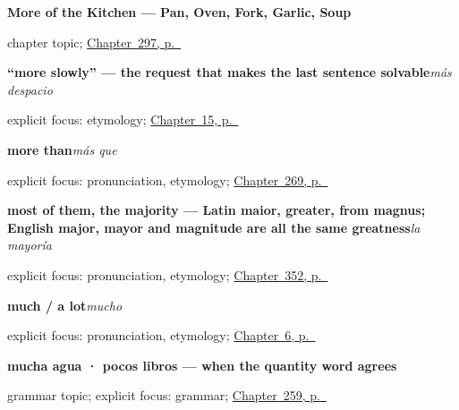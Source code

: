 \noindent\begin{minipage}[t]{\linewidth}
\raggedright
\textbf{More of the Kitchen --- Pan, Oven, Fork, Garlic, Soup}\par
\footnotesize chapter topic; \hyperref[ch:la-cocina]{Chapter~297, p.~\pageref*{ch:la-cocina}}
\end{minipage}\par\smallskip

\noindent\begin{minipage}[t]{\linewidth}
\raggedright
\textbf{\textquotedblleft{}more slowly\textquotedblright{} — the request that makes the last sentence solvable}\enspace\emph{más despacio}\par
\footnotesize explicit focus: etymology; \hyperref[ch:repair]{Chapter~15, p.~\pageref*{ch:repair}}
\end{minipage}\par\smallskip

\noindent\begin{minipage}[t]{\linewidth}
\raggedright
\textbf{more than}\enspace\emph{más que}\par
\footnotesize explicit focus: pronunciation, etymology; \hyperref[ch:experiencia]{Chapter~269, p.~\pageref*{ch:experiencia}}
\end{minipage}\par\smallskip

\noindent\begin{minipage}[t]{\linewidth}
\raggedright
\textbf{most of them, the majority — Latin maior, greater, from magnus; English major, mayor and magnitude are all the same greatness}\enspace\emph{la mayoría}\par
\footnotesize explicit focus: pronunciation, etymology; \hyperref[ch:el-conjunto-y-el-resto]{Chapter~352, p.~\pageref*{ch:el-conjunto-y-el-resto}}
\end{minipage}\par\smallskip

\noindent\begin{minipage}[t]{\linewidth}
\raggedright
\textbf{much / a lot}\enspace\emph{mucho}\par
\footnotesize explicit focus: pronunciation, etymology; \hyperref[ch:asking-a-name]{Chapter~6, p.~\pageref*{ch:asking-a-name}}
\end{minipage}\par\smallskip

\noindent\begin{minipage}[t]{\linewidth}
\raggedright
\textbf{mucha agua · pocos libros — when the quantity word agrees}\par
\footnotesize grammar topic; explicit focus: grammar; \hyperref[ch:mucha-agua]{Chapter~259, p.~\pageref*{ch:mucha-agua}}
\end{minipage}\par\smallskip

